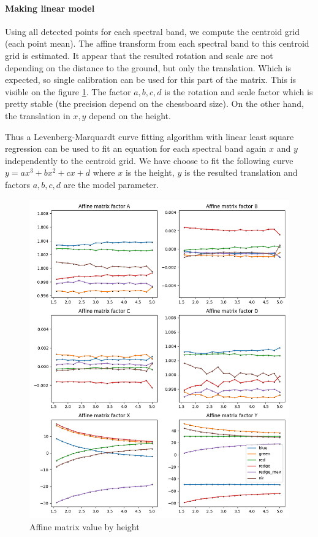 \documentclass[]{elsarticle}
\begin{document}
	\paragraph{Making linear model}
	Using all detected points for each spectral band, we compute the centroid grid (each point mean).
	The affine transform from each spectral band to this centroid grid is estimated.
	It appear that the resulted rotation and scale are not depending on the distance to the ground, but only the translation.
	Which is expected, so single calibration can be used for this part of the matrix.
	This is visible on the figure \ref{fig:affine-translation-height}.
	The factor $a,b,c,d$ is the rotation and scale factor which is pretty stable (the precision depend on the chessboard size).
	On the other hand, the translation in $x, y$ depend on the height.
	
	Thus a Levenberg-Marquardt curve fitting algorithm with linear least square regression \cite{More78}
	can be used to fit an equation for each spectral band again $x$ and $y$ independently to the centroid grid.
	We have choose to fit the following curve $y = ax^3 + bx^2 + cx + d$ where $x$ is the height,
	$y$ is the resulted translation and factors $a,b,c,d$ are the model parameter.
	
	\begin{figure}[!htb]
		\centering
		\includegraphics[width=\linewidth]{../figures/affine-translation-height.png}
		\caption{Affine matrix value by height}
		\label{fig:affine-translation-height}
	\end{figure}
	
\end{document}
